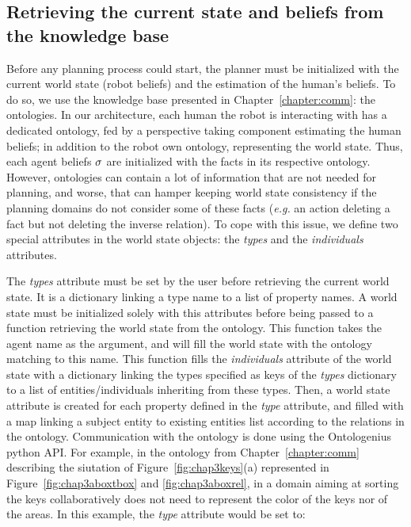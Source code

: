 \documentclass[a4paper,11pt,twoside]{StyleThese}
\begin{document}
\subsection{Retrieving the current state and beliefs from the knowledge base}
Before any planning process could start, the planner must be initialized with the current world state (robot beliefs) and the estimation of the human's beliefs. To do so, we use the knowledge base presented in Chapter~\ref{chapter:comm}: the ontologies. In our architecture, each human the robot is interacting with has a dedicated ontology, fed by a perspective taking component estimating the human beliefs; in addition to the robot own ontology, representing the world state. Thus, each agent beliefs $\sigma$ are initialized with the facts in its respective ontology.
However, ontologies can contain a lot of information that are not needed for planning, and worse, that can hamper keeping world state consistency if the planning domains do not consider some of these facts (\textit{e.g.} an action deleting a fact but not deleting the inverse relation). To cope with this issue, we define two special attributes in the world state objects: the \textit{types} and the \textit{individuals} attributes.

The \textit{types} attribute must be set by the user before retrieving the current world state. It is a dictionary linking a type name to a list of property names. A world state must be initialized solely with this attributes before being passed to a function retrieving the world state from the ontology. This function takes the agent name as the argument, and will fill the world state with the ontology matching to this name. This function fills the \textit{individuals} attribute of the world state with a dictionary linking the types specified as keys of the  \textit{types} dictionary to a list of entities/individuals inheriting from these types. Then, a world state attribute is created for each property defined in the \textit{type} attribute, and filled with a map linking a subject entity to existing entities list according to the relations in the ontology. Communication with the ontology is done using the Ontologenius~\cite{sarthou2019ontologenius} python API. For example, in the ontology from Chapter~\ref{chapter:comm} describing the siutation of Figure~\ref{fig:chap3keys}(a) represented in Figure~\ref{fig:chap3aboxtbox} and \ref{fig:chap3aboxrel}, in a domain aiming at sorting the keys collaboratively does not need to represent the color of the keys nor of the areas. In this example, the \textit{type} attribute would be set to: 
\end{document}
